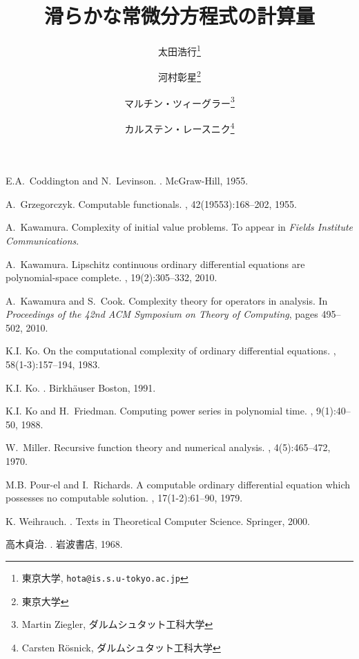 \documentclass[11pt, a4paper, twocolumn]{jsarticle}
\title{滑らかな常微分方程式の計算量}
\author{%
太田浩行\thanks{東京大学, \texttt{hota@is.s.u-tokyo.ac.jp}} 
\and
河村彰星\thanks{東京大学}%
\and
マルチン・ツィーグラー\thanks{Martin Ziegler, ダルムシュタット工科大学}
\and
カルステン・レースニク\thanks{Carsten R\"osnick, ダルムシュタット工科大学}
}
\date{}
\theoremstyle{definition}
\begin{document}
\maketitle








\begin{thebibliography}{10}
\narrowbaselines

E.A.~Coddington and N.~Levinson.
.
\newblock McGraw-Hill, 1955.

A.~Grzegorczyk.
\newblock Computable functionals.
, 42(19553):168--202, 1955.

A.~Kawamura.
\newblock Complexity of initial value problems.
\newblock To appear in {\em Fields Institute Communications}.

A.~Kawamura.
\newblock Lipschitz continuous ordinary differential equations are
  polynomial-space complete.
, 19(2):305--332, 2010.

A.~Kawamura and S.~Cook.
\newblock Complexity theory for operators in analysis.
\newblock In {\em Proceedings of the 42nd ACM Symposium on Theory of
  Computing}, pages 495--502, 2010.

K.I. Ko.
\newblock On the computational complexity of ordinary differential equations.
, 58(1-3):157--194, 1983.

K.I. Ko.
.
\newblock Birkh{\"a}user Boston, 1991.

K.I. Ko and H.~Friedman.
\newblock Computing power series in polynomial time.
, 9(1):40--50, 1988.

W.~Miller.
\newblock Recursive function theory and numerical analysis.
, 4(5):465--472, 1970.

M.B. Pour-el and I.~Richards.
\newblock A computable ordinary differential equation which possesses no
  computable solution.
, 17(1-2):61--90, 1979.

K. Weihrauch.
.
\newblock Texts in Theoretical Computer Science. Springer, 2000.

高木貞治.
.
\newblock 岩波書店, 1968.

\end{thebibliography}
\end{document}
